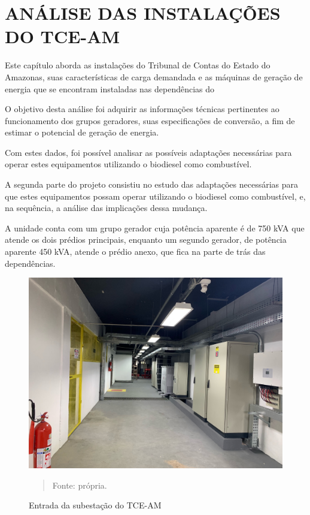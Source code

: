 \section{ANÁLISE DAS INSTALAÇÕES DO TCE-AM} %

\hspace*{0.8cm}Este capítulo aborda as instalações do Tribunal de Contas do Estado do Amazonas, suas características de carga demandada e as máquinas de geração de energia que se encontram instaladas nas dependências do 

O objetivo desta análise foi adquirir as informações técnicas pertinentes ao funcionamento dos grupos geradores, suas especificações de conversão, a fim de estimar o potencial de geração de energia.

Com estes dados, foi possível analisar as possíveis adaptações necessárias para operar estes equipamentos utilizando o biodiesel como combustível.

A segunda parte do projeto consistiu no estudo das adaptações necessárias para que estes equipamentos possam operar utilizando o biodiesel como combustível, e, na sequência, a análise das implicações dessa mudança.

A unidade conta com um grupo gerador cuja potência aparente é de 750 kVA que atende os dois prédios principais, enquanto um segundo gerador, de potência aparente 450 kVA, atende o prédio anexo, que fica na parte de trás das dependências. 
    
\begin{figure}[H]
\begin{center}
			\caption{Entrada da subestação do TCE-AM}
			\includegraphics[width=.9\textwidth]{Figuras/deps.jpeg}
            \vspace*{\fill} 
            \begin{quote} 
            \centering 
            Fonte: própria.
            \end{quote}
            \vspace*{\fill}
			\label{fig:tceinst}
\end{center}
\end{figure}

